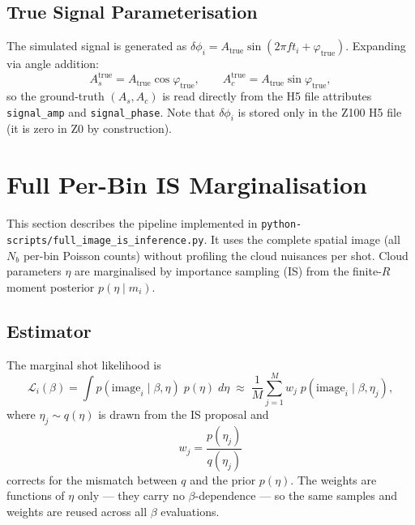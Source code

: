 \documentclass[11pt,a4paper]{article}
\begin{document}
\subsection{True Signal Parameterisation}

The simulated signal is generated as
$\delta\phi_i = A_\mathrm{true}\sin(2\pi f t_i + \varphi_\mathrm{true})$.
Expanding via angle addition:
\begin{equation}
  A_s^\mathrm{true} = A_\mathrm{true}\cos\varphi_\mathrm{true},
  \qquad
  A_c^\mathrm{true} = A_\mathrm{true}\sin\varphi_\mathrm{true},
\end{equation}
so the ground-truth $(A_s, A_c)$ is read directly from the H5 file attributes
\texttt{signal\_amp} and \texttt{signal\_phase}.  Note that $\delta\phi_i$ is
stored only in the Z100 H5 file (it is zero in Z0 by construction).

\section{Full Per-Bin IS Marginalisation}
\label{sec:full_bin_is}

This section describes the pipeline implemented in
\texttt{python-scripts/full\_image\_is\_inference.py}.  It uses the
complete spatial image (all $N_b$ per-bin Poisson counts) without
profiling the cloud nuisances per shot.  Cloud parameters $\eta$ are
marginalised by importance sampling (IS) from the finite-$R$ moment
posterior $p(\eta \mid m_i)$.

\subsection{Estimator}

The marginal shot likelihood is
\begin{equation}
  \mathcal{L}_i(\beta)
  = \int p(\text{image}_i \mid \beta, \eta)\; p(\eta)\; d\eta
  \;\approx\;
  \frac{1}{M}\sum_{j=1}^M w_j\; p(\text{image}_i \mid \beta, \eta_j),
  \label{eq:is_full_estimator}
\end{equation}
where $\eta_j \sim q(\eta)$ is drawn from the IS proposal and
\begin{equation}
  w_j = \frac{p(\eta_j)}{q(\eta_j)}
  \label{eq:is_weight_full}
\end{equation}
corrects for the mismatch between $q$ and the prior $p(\eta)$.  The
weights are functions of $\eta$ only — they carry no $\beta$-dependence
— so the same samples and weights are reused across all $\beta$
evaluations.
\end{document}
